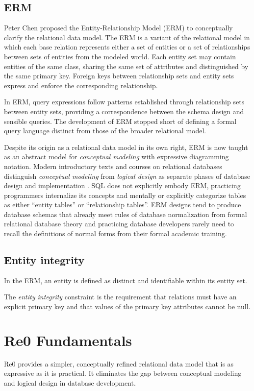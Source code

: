 \documentclass[letter,10pt]{article}
\begin{document}
\subsection{ERM}
Peter Chen \citep{chen_entity_1976} proposed the Entity-Relationship Model (ERM) to conceptually clarify the relational data model.
The ERM is a variant of the relational model in which each base relation represents either a set of entities or a set of relationships between sets of entities from the modeled world. 
Each entity set may contain entities of the same class, sharing the same set of attributes and distinguished by the same  primary key.
Foreign keys between relationship sets and entity sets express and enforce the corresponding relationship.

In ERM, query expressions follow patterns established through relationship sets between entity sets, providing a correspondence between the schema design and sensible queries. 
The development of ERM stopped short of defining a formal query language distinct from those of the broader relational model.

Despite its origin as a relational data model in its own right, ERM is now taught as an abstract model for \emph{conceptual modeling} with expressive diagramming notation.  
Modern introductory texts and courses on relational databases distinguish \emph{conceptual modeling} from \emph{logical design} as separate phases of database design and implementation \citep{elmasri-2015-fundamentals, coronel-2016-database}.
SQL does not explicitly embody ERM, practicing programmers internalize its concepts and  mentally or explicitly categorize tables as either ``entity tables'' or ``relationship tables''.  
ERM designs tend to produce database schemas that already  meet rules of database normalization from formal relational database theory and practicing database developers rarely need to recall the definitions of normal forms from their formal academic training.

\subsection{Entity integrity}
In the ERM, an entity is defined as distinct and identifiable within its entity set. 

The \emph{entity integrity} constraint is the requirement that relations must have an explicit primary key and that values of the primary key attributes cannot be null. 

\section{Re0 Fundamentals}
Re0 provides a simpler, conceptually refined relational data model that is as expressive as it is practical. 
It eliminates the gap between conceptual modeling and logical design in database development.
\end{document}
